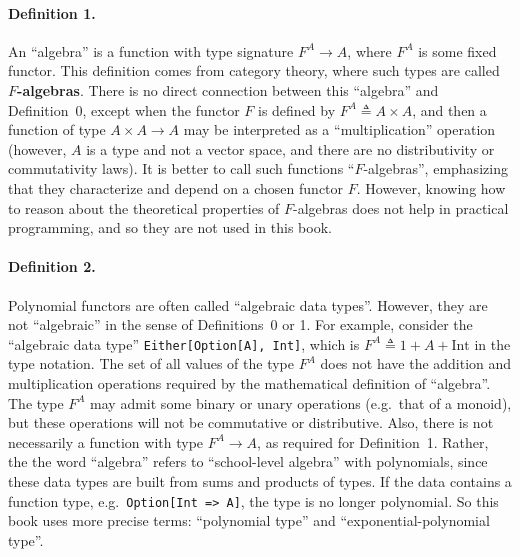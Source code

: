 \paragraph{Definition 1.}

An ``algebra'' is a function with type signature $F^{A}\rightarrow A$,
where $F^{A}$ is some fixed functor. This definition comes from category
theory, where such types are called \textbf{$F$-algebras}.
There is no direct connection between this ``algebra'' and Definition~0,
except when the functor $F$ is defined by $F^{A}\triangleq A\times A$,
and then a function of type $A\times A\rightarrow A$ may be interpreted
as a ``multiplication'' operation (however, $A$ is a type and not
a vector space, and there are no distributivity or commutativity laws).
It is better to call such functions ``$F$-algebras'', emphasizing
that they characterize and depend on a chosen functor $F$. However,
knowing how to reason about the theoretical properties of $F$-algebras
does not help in practical programming, and so they are not used in
this book.

\paragraph{Definition 2.}

Polynomial functors are often called \textquotedblleft algebraic data
types\textquotedblright . However, they are not \textquotedblleft algebraic\textquotedblright{}
in the sense of Definitions~0 or 1. For example, consider the \textquotedblleft algebraic
data type\textquotedblright{} \lstinline!Either[Option[A], Int]!,
which is $F^{A}\triangleq1+A+\text{Int}$ in the type notation. The
set of all values of the type $F^{A}$ does not have the addition
and multiplication operations required by the mathematical definition
of ``algebra''. The type $F^{A}$ may admit some binary or unary
operations (e.g.~that of a monoid), but these operations will not
be commutative or distributive. Also, there is not necessarily a function
with type $F^{A}\rightarrow A$, as required for Definition~1. Rather,
the the word ``algebra'' refers to ``school-level algebra'' with
polynomials, since these data types are built from sums and products
of types. If the data contains a function type, e.g.~\lstinline!Option[Int => A]!,
the type is no longer polynomial. So this book uses more precise terms:
\textquotedblleft polynomial type\textquotedblright{} and \textquotedblleft exponential-polynomial
type\textquotedblright .

